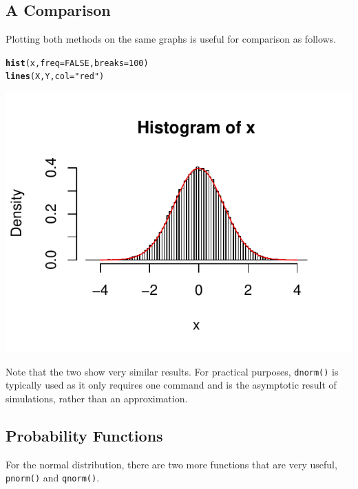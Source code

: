 \documentclass{report}\usepackage[]{graphicx}\usepackage[]{color}
\makeatletter
\def\maxwidth{ %
  \ifdim\Gin@nat@width>\linewidth
    \linewidth
  \else
    \Gin@nat@width
  \fi
}
\newcommand{\hlnum}[1]{\textcolor[rgb]{0.686,0.059,0.569}{#1}}%
\newcommand{\hlstr}[1]{\textcolor[rgb]{0.192,0.494,0.8}{#1}}%
\newcommand{\hlstd}[1]{\textcolor[rgb]{0.345,0.345,0.345}{#1}}%
\newcommand{\hlkwc}[1]{\textcolor[rgb]{0.333,0.667,0.333}{#1}}%
\newcommand{\hlkwd}[1]{\textcolor[rgb]{0.737,0.353,0.396}{\textbf{#1}}}%
\newenvironment{kframe}{%
 \def\at@end@of@kframe{}%
 \ifinner\ifhmode%
  \def\at@end@of@kframe{\end{minipage}}%
  \begin{minipage}{\columnwidth}%
 \fi\fi%
 \def\FrameCommand##1{\hskip\@totalleftmargin \hskip-\fboxsep
 \colorbox{shadecolor}{##1}\hskip-\fboxsep
     \hskip-\linewidth \hskip-\@totalleftmargin \hskip\columnwidth}%
 \MakeFramed {\advance\hsize-\width
   \@totalleftmargin\z@ \linewidth\hsize
   \@setminipage}}%
 {\par\unskip\endMakeFramed%
 \at@end@of@kframe}
\newenvironment{knitrout}{}{} %
\makeatother
\begin{document}
\subsection{A Comparison} 
Plotting both methods on the same graphs is useful for comparison as follows.  
\begin{knitrout}
\color{fgcolor}\begin{kframe}
\begin{alltt}
\hlkwd{hist}\hlstd{(x,} \hlkwc{freq} \hlstd{=} \hlnum{FALSE}\hlstd{,} \hlkwc{breaks} \hlstd{=} \hlnum{100}\hlstd{)}
\hlkwd{lines}\hlstd{(X,Y,} \hlkwc{col} \hlstd{=} \hlstr{"red"}\hlstd{)}
\end{alltt}
\end{kframe}

{\centering \includegraphics[width=\maxwidth]{figure/unnamed-chunk-84-1} 

}



\end{knitrout}

Note that the two show very similar results.  For practical purposes, \texttt{dnorm()} is typically used as it only requires one command and is the asymptotic result of simulations, rather than an approximation.  

\subsection{Probability Functions}
For the normal distribution, there are two more functions that are very useful, \texttt{pnorm()} and \texttt{qnorm()}. 
\end{document}
